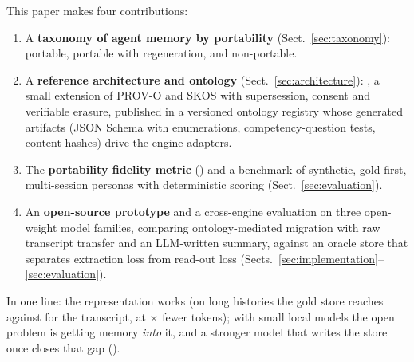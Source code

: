 This paper makes four contributions:
\begin{enumerate}
  \item A \textbf{taxonomy of agent memory by portability} (Sect.~\ref{sec:taxonomy}): portable,
    portable with regeneration, and non-portable.
  \item A \textbf{reference architecture and ontology} (Sect.~\ref{sec:architecture}): \memcore,
    a small extension of PROV-O and SKOS with supersession, consent and verifiable erasure,
    published in a versioned ontology registry whose generated artifacts (JSON Schema with
    enumerations, competency-question tests, content hashes) drive the engine adapters.
  \item The \textbf{portability fidelity metric} (\PFM) and a benchmark of synthetic,
    gold-first, multi-session personas with deterministic scoring (Sect.~\ref{sec:evaluation}).
  \item An \textbf{open-source prototype} and a cross-engine evaluation on three open-weight
    model families, comparing ontology-mediated migration with raw transcript transfer and an
    LLM-written summary, against an oracle store that separates extraction loss from read-out
    loss (Sects.~\ref{sec:implementation}--\ref{sec:evaluation}).
\end{enumerate}

In one line: the representation works (on long histories the gold store reaches \PFM
{} against  for the transcript, at
$\times$ fewer tokens); with small local models the open problem is
getting memory \emph{into} it, and a stronger model that writes the store once closes that gap
().
